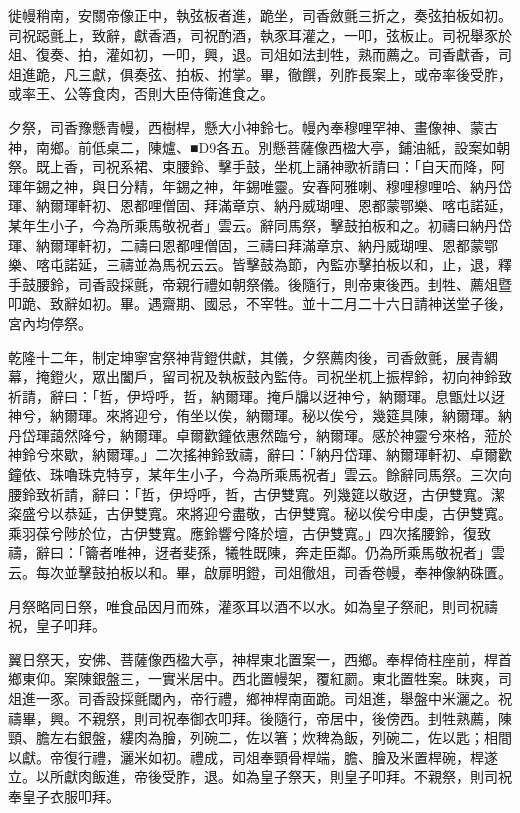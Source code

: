 \begin{pinyinscope}
徙幔稍南，安關帝像正中，執弦板者進，跪坐，司香斂氈三折之，奏弦拍板如初。司祝跽氈上，致辭，獻香酒，司祝酌酒，執豕耳灌之，一叩，弦板止。司祝舉豕於俎、復奏、拍，灌如初，一叩，興，退。司俎如法刲牲，熟而薦之。司香獻香，司俎進跪，凡三獻，俱奏弦、拍板、拊掌。畢，徹饌，列胙長案上，或帝率後受胙，或率王、公等食肉，否則大臣侍衛進食之。

夕祭，司香豫懸青幔，西樹桿，懸大小神鈴七。幔內奉穆哩罕神、畫像神、蒙古神，南鄉。前低桌二，陳爐、■D9各五。別懸菩薩像西楹大亭，鋪油紙，設案如朝祭。既上香，司祝系裙、束腰鈴、擊手鼓，坐杌上誦神歌祈請曰：「自天而降，阿琿年錫之神，與日分精，年錫之神，年錫唯靈。安春阿雅喇、穆哩穆哩哈、納丹岱琿、納爾琿軒初、恩都哩僧固、拜滿章京、納丹威瑚哩、恩都蒙鄂樂、喀屯諾延，某年生小子，今為所乘馬敬祝者」雲云。辭同馬祭，擊鼓拍板和之。初禱曰納丹岱琿、納爾琿軒初，二禱曰恩都哩僧固，三禱曰拜滿章京、納丹威瑚哩、恩都蒙鄂樂、喀屯諾延，三禱並為馬祝云云。皆擊鼓為節，內監亦擊拍板以和，止，退，釋手鼓腰鈴，司香設採氈，帝親行禮如朝祭儀。後隨行，則帝東後西。刲牲、薦俎暨叩跪、致辭如初。畢。遇齋期、國忌，不宰牲。並十二月二十六日請神送堂子後，宮內均停祭。

乾隆十二年，制定坤寧宮祭神背鐙供獻，其儀，夕祭薦肉後，司香斂氈，展青綢幕，掩鐙火，眾出闔戶，留司祝及執板鼓內監侍。司祝坐杌上振桿鈴，初向神鈴致祈請，辭曰：「哲，伊埒呼，哲，納爾琿。掩戶牖以迓神兮，納爾琿。息甑灶以迓神兮，納爾琿。來將迎兮，侑坐以俟，納爾琿。秘以俟兮，幾筵具陳，納爾琿。納丹岱琿藹然降兮，納爾琿。卓爾歡鐘依惠然臨兮，納爾琿。感於神靈兮來格，蒞於神鈴兮來歇，納爾琿。」二次搖神鈴致禱，辭曰：「納丹岱琿、納爾琿軒初、卓爾歡鐘依、珠嚕珠克特亨，某年生小子，今為所乘馬祝者」雲云。餘辭同馬祭。三次向腰鈴致祈請，辭曰：「哲，伊埒呼，哲，古伊雙寬。列幾筵以敬迓，古伊雙寬。潔粢盛兮以恭延，古伊雙寬。來將迎兮盡敬，古伊雙寬。秘以俟兮申虔，古伊雙寬。乘羽葆兮陟於位，古伊雙寬。應鈴響兮降於壇，古伊雙寬。」四次搖腰鈴，復致禱，辭曰：「籥者唯神，迓者斐孫，犧牲既陳，奔走臣鄰。仍為所乘馬敬祝者」雲云。每次並擊鼓拍板以和。畢，啟扉明鐙，司俎徹俎，司香卷幔，奉神像納硃匱。

月祭略同日祭，唯食品因月而殊，灌豕耳以酒不以水。如為皇子祭祀，則司祝禱祝，皇子叩拜。

翼日祭天，安佛、菩薩像西楹大亭，神桿東北置案一，西鄉。奉桿倚柱座前，桿首鄉東仰。案陳銀盤三，一實米居中。西北置幔架，覆紅罽。東北置牲案。昧爽，司俎進一豕。司香設採氈閾內，帝行禮，鄉神桿南面跪。司俎進，舉盤中米灑之。祝禱畢，興。不親祭，則司祝奉御衣叩拜。後隨行，帝居中，後傍西。刲牲熟薦，陳頸、膽左右銀盤，縷肉為膾，列碗二，佐以箸；炊稗為飯，列碗二，佐以匙；相間以獻。帝復行禮，灑米如初。禮成，司俎奉頸骨桿端，膽、膾及米置桿碗，桿遂立。以所獻肉飯進，帝後受胙，退。如為皇子祭天，則皇子叩拜。不親祭，則司祝奉皇子衣服叩拜。


\end{pinyinscope}
